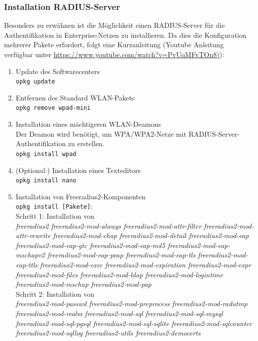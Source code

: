 \subsubsection{Installation RADIUS-Server}
Besonders zu erwähnen ist die Möglichkeit einen RADIUS-Server für die Authentifikation in Enterprise-Netzen zu installieren. Da dies die Konfiguration mehrerer Pakete erfordert, folgt eine Kurzanleitung (Youtube Anleitung verfügbar unter \url{https://www.youtube.com/watch?v=PvUqMFvTOn8)}):
\begin{enumerate}
	\item {Update des Softwarecenters}\\
	\colorbox{altgray}{\lstinline|opkg update|}
	\item {Entfernen des Standard WLAN-Pakets}\\
	\colorbox{altgray}{\lstinline|opkg remove wpad-mini|}
	\item { Installation eines mächtigeren WLAN-Deamons}\\
	Der Deamon wird benötigt, um WPA/WPA2-Netze mit RADIUS-Server-Authentifikation zu erstellen. \\
	 \colorbox{altgray}{\lstinline|opkg install wpad|}
	\item {(Optional:) Installation eines Texteditors}\\ \colorbox{altgray}{\lstinline|opkg install nano|}
	\item {Installation von Freeradius2-Komponenten}\\
	\colorbox{altgray}{\lstinline|opkg install [Pakete]|}:\\
	Schritt 1: Installation von\\
	\textit{freeradius2 freeradius2-mod-always freeradius2-mod-attr-filter freeradius2-mod-attr-rewrite freeradius2-mod-chap freeradius2-mod-detail freeradius2-mod-eap freeradius2-mod-eap-gtc freeradius2-mod-eap-md5 freeradius2-mod-eap-mschapv2 freeradius2-mod-eap-peap freeradius2-mod-eap-tls freeradius2-mod-eap-ttls freeradius2-mod-exec freeradius2-mod-expiration freeradius2-mod-expr freeradius2-mod-files freeradius2-mod-ldap freeradius2-mod-logintime freeradius2-mod-mschap freeradius2-mod-pap}\\
	Schritt 2: Installation von\\
	\textit{freeradius2-mod-passwd freeradius2-mod-preprocess freeradius2-mod-radutmp freeradius2-mod-realm freeradius2-mod-sql freeradius2-mod-sql-mysql freeradius2-mod-sql-pgsql freeradius2-mod-sql-sqlite freeradius2-mod-sqlcounter freeradius2-mod-sqllog freeradius2-utils freeradius2-democerts}

\end{enumerate}

